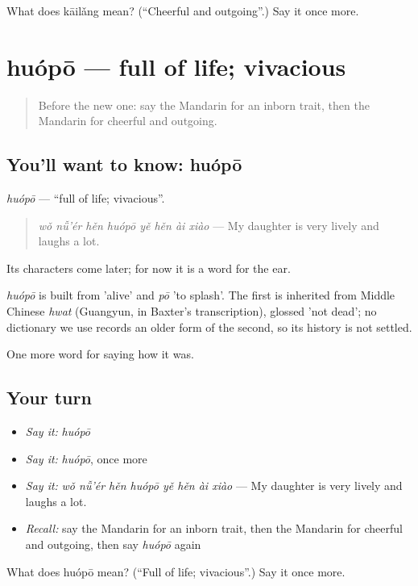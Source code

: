 \begin{tcolorbox}[breakable,colback=teal!4,colframe=teal!35!black,title={Before you move on}]
What does kāilǎng mean? (\textquotedblleft{}Cheerful and outgoing\textquotedblright{}.) Say it once more.
\end{tcolorbox}
\section[huópō]{huópō — full of life; vivacious}

\label{lesson:ZH-C467-huopo}



\begin{quote}
Before the new one: say the Mandarin for an inborn trait, then the Mandarin for cheerful and outgoing.
\end{quote}

\subsection*{You'll want to know: huópō}
\emph{huópō} — \textquotedblleft{}full of life; vivacious\textquotedblright{}.

\begin{quote}
\emph{wǒ nǚ'ér hěn huópō yě hěn ài xiào} — My daughter is very lively and laughs a lot.
\end{quote}

Its characters come later; for now it is a word for the ear.

\begin{cousinweb}
\emph{huópō} is built from  'alive' and \emph{pō} 'to splash'. The first is inherited from Middle Chinese \emph{hwat} (Guangyun, in Baxter's transcription), glossed 'not dead'; no dictionary we use records an older form of the second, so its history is not settled.
\end{cousinweb}

\begin{grammarlens}[title={What you've built}]
One more word for saying how it was.
\end{grammarlens}

\subsection*{Your turn}
\begin{itemize}
\raggedright
  \item \emph{Say it:} \emph{huópō}
  \item \emph{Say it:} \emph{huópō}, once more
  \item \emph{Say it:} \emph{wǒ nǚ'ér hěn huópō yě hěn ài xiào} — My daughter is very lively and laughs a lot.
  \item \emph{Recall:} say the Mandarin for an inborn trait, then the Mandarin for cheerful and outgoing, then say \emph{huópō} again
\end{itemize}

\begin{tcolorbox}[breakable,colback=teal!4,colframe=teal!35!black,title={Before you move on}]
What does huópō mean? (\textquotedblleft{}Full of life; vivacious\textquotedblright{}.) Say it once more.
\end{tcolorbox}
